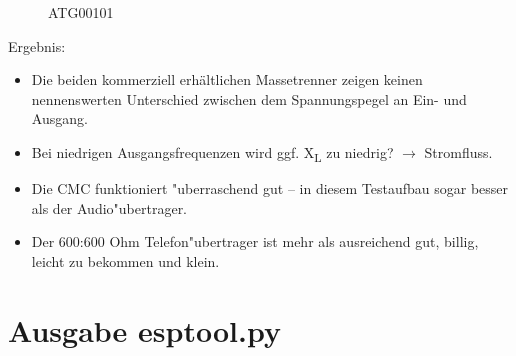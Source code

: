 \documentclass[ngerman,11pt,parskip=half] {scrartcl}
\newcommand {\tscopesize}{12cm}
\begin{document}
\begin{figure}[H]
\centering
{}
\caption{ATG00101} \label{fig:1}
\end{figure}

Ergebnis:
\begin{itemize}
\item Die beiden kommerziell erhältlichen Massetrenner zeigen keinen nennenswerten Unterschied zwischen dem Spannungspegel an Ein- und Ausgang.
\item Bei niedrigen Ausgangsfrequenzen wird ggf. X\textsubscript{L} zu niedrig? $\rightarrow$ Stromfluss.
\item Die CMC funktioniert "uberraschend gut -- in diesem Testaufbau sogar besser als der Audio"ubertrager.
\item Der 600:600 Ohm Telefon"ubertrager ist mehr als ausreichend gut, billig, leicht zu bekommen und klein.
\end{itemize}



\appendix

\section{Ausgabe esptool.py}
\end{document}
